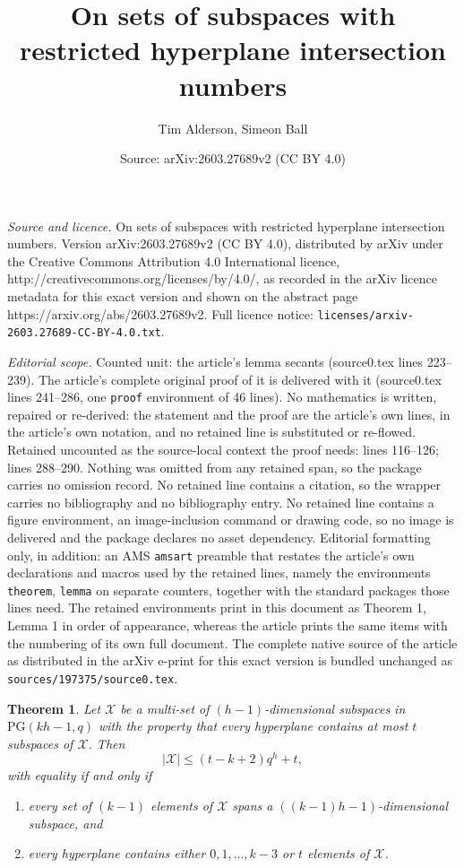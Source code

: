 \documentclass[10pt,a4paper]{amsart}
\title{On sets of subspaces with restricted hyperplane intersection numbers}
\author{Tim Alderson, Simeon Ball}
\date{Source: arXiv:2603.27689v2 (CC BY 4.0)}
\newtheorem{theorem}{Theorem}
\begin{document}
\maketitle

\noindent\emph{Source and licence.} On sets of subspaces with restricted hyperplane intersection numbers. Version arXiv:2603.27689v2 (CC BY 4.0), distributed by arXiv under the Creative Commons Attribution 4.0 International licence, http://creativecommons.org/licenses/by/4.0/, as recorded in the arXiv licence metadata for this exact version and shown on the abstract page https://arxiv.org/abs/2603.27689v2. Full licence notice: \texttt{licenses/arxiv-2603.27689-CC-BY-4.0.txt}.\par\smallskip

\noindent\textit{Editorial scope.} Counted unit: the article's lemma secants (source0.tex lines 223--239). The article's complete original proof of it is delivered with it (source0.tex lines 241--286, one \texttt{proof} environment of 46 lines). No mathematics is written, repaired or re-derived: the statement and the proof are the article's own lines, in the article's own notation, and no retained line is substituted or re-flowed.  Retained uncounted as the source-local context the proof needs: lines 116--126; lines 288--290.  Nothing was omitted from any retained span, so the package carries no omission record.  No retained line contains a citation, so the wrapper carries no bibliography and no bibliography entry.  No retained line contains a figure environment, an image-inclusion command or drawing code, so no image is delivered and the package declares no asset dependency.  Editorial formatting only, in addition: an AMS \texttt{amsart} preamble that restates the article's own declarations and macros used by the retained lines, namely the environments \texttt{theorem}, \texttt{lemma} on separate counters, together with the standard packages those lines need.  The retained environments print in this document as Theorem 1, Lemma 1 in order of appearance, whereas the article prints the same items with the numbering of its own full document.  The complete native source of the article as distributed in the arXiv e-print for this exact version is bundled unchanged as \texttt{sources/197375/source0.tex}.
	\begin{theorem} \label{mainthm}
		Let $\mathcal{X}$ be a multi-set of $(h-1)$-dimensional subspaces in $\mathrm{PG}(kh-1,q)$ with the property that every hyperplane contains at most $t$ subspaces of $\mathcal{X}$. Then
		\begin{equation} \label{eqn: maximal arc bound}
			|\mathcal{X}| \le (t-k+2)q^h+t,
		\end{equation}
		with equality if and only if
		\begin{enumerate}
			\item every set of $(k-1)$ elements of $\mathcal{X}$ spans a $((k-1)h-1)$-dimensional subspace, and \label{part: mainthm 1}
			\item every hyperplane contains either $0, 1, \ldots, k-3$ or $t$ elements of $\mathcal{X}$. \label{part: mainthm 2}
		\end{enumerate}
	\end{theorem}
\end{document}

